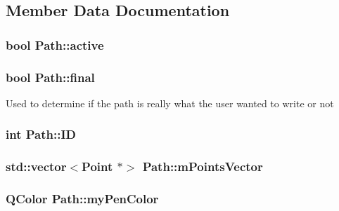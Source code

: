 \subsection{Member Data Documentation}
\hypertarget{classPath_a80d925a5ed65133cd0e96bc2a10a2d3c}{
\subsubsection[{active}]{\setlength{\rightskip}{0pt plus 5cm}bool {\bf Path::active}}}
\label{classPath_a80d925a5ed65133cd0e96bc2a10a2d3c}
\hypertarget{classPath_a657da9ea45a6b01a77c7b5442cace564}{
\subsubsection[{final}]{\setlength{\rightskip}{0pt plus 5cm}bool {\bf Path::final}}}
\label{classPath_a657da9ea45a6b01a77c7b5442cace564}
Used to determine if the path is really what the user wanted to write or not \hypertarget{classPath_a5c1880b5bc26ef03c335687c6edd7921}{
\subsubsection[{ID}]{\setlength{\rightskip}{0pt plus 5cm}int {\bf Path::ID}}}
\label{classPath_a5c1880b5bc26ef03c335687c6edd7921}
\hypertarget{classPath_a88b86252aa1a027b0417a8d5a2dc3f2d}{
\subsubsection[{mPointsVector}]{\setlength{\rightskip}{0pt plus 5cm}std::vector$<${\bf Point} $\ast$$>$ {\bf Path::mPointsVector}}}
\label{classPath_a88b86252aa1a027b0417a8d5a2dc3f2d}
\hypertarget{classPath_aa4957231df4c43c1dff18df7caa4f0d8}{
\subsubsection[{myPenColor}]{\setlength{\rightskip}{0pt plus 5cm}QColor {\bf Path::myPenColor}}}
